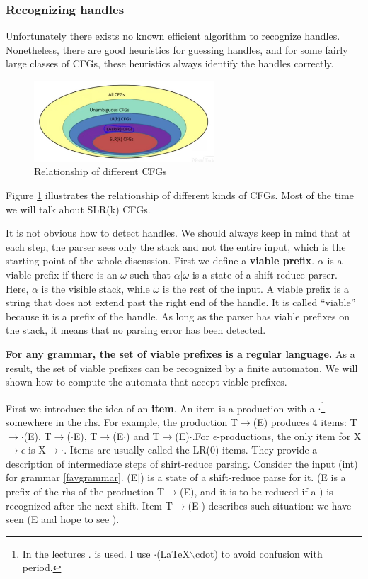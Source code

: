 \subsubsection{Recognizing handles}
Unfortunately there exists no known efficient algorithm to recognize handles. Nonetheless, there are good heuristics for guessing handles, and for some fairly large classes of CFGs, these heuristics always identify the handles correctly.
\begin{figure}[ht]
\centering
\includegraphics[width = 0.6\textwidth]{cfgvenn.jpg}
\caption{Relationship of different CFGs}\label{CFGsvenn}
\end{figure}
Figure \ref{CFGsvenn} illustrates the relationship of different kinds of CFGs. Most of the time we will talk about SLR(k) CFGs.

It is not obvious how to detect handles. We should always keep in mind that at each step, the parser sees only the stack and not the entire input, which is the starting point of the whole discussion. First we define a {\bf viable prefix}. $\alpha$ is a viable prefix if there is an $\omega$ such that $\alpha|\omega$ is a state of a shift-reduce parser. Here, $\alpha$ is the visible stack, while $\omega$ is the rest of the input. A viable prefix is a string that does not extend past the right end of the handle. It is called ``viable'' because it is a prefix of the handle. As long as the parser has viable prefixes on the stack, it means that no parsing error has been detected.

{\bf For any grammar, the set of viable prefixes is a regular language.} As a result, the set of viable prefixes can be recognized by a finite automaton. We will shown how to compute the automata that accept viable prefixes.

First we introduce the idea of an \textbf{item}. An item is a production with a $\cdot$\footnote{In the lectures . is used. I use $\cdot$(\LaTeX $\backslash$cdot) to avoid confusion with period.} somewhere in the rhs. For example, the production T$\rightarrow$(E) produces 4 items:  T$\rightarrow\cdot$(E), T$\rightarrow$($\cdot$E), T$\rightarrow$(E$\cdot$) and T$\rightarrow$(E)$\cdot$.For $\epsilon$-productions, the only item for X$\rightarrow\epsilon$ is X$\rightarrow\cdot$. Items are usually called the LR(0) items. They provide a description of intermediate steps of shirt-reduce parsing. Consider the input (int) for grammar \eqref{favgrammar}. (E$|$) is a state of a shift-reduce parse for it. (E is a prefix of the rhs of the production T$\rightarrow$(E), and it is to be reduced if a ) is recognized after the next shift. Item T$\rightarrow$(E$\cdot$) describes such situation: we have seen (E and hope to see ).

